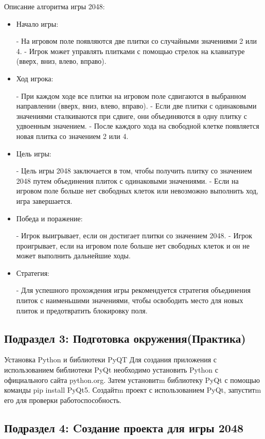 Описание алгоритма игры 2048:
\begin{itemize}
\item Начало игры:

   - На игровом поле появляются две плитки со случайными значениями 2 или 4.
   - Игрок может управлять плитками с помощью стрелок на клавиатуре (вверх, вниз, влево, вправо).
\item Ход игрока:

   - При каждом ходе все плитки на игровом поле сдвигаются в выбранном направлении (вверх, вниз, влево, вправо).
   - Если две плитки с одинаковыми значениями сталкиваются при сдвиге, они объединяются в одну плитку с удвоенным значением.
   - После каждого хода на свободной клетке появляется новая плитка со значением 2 или 4.
\item  Цель игры:

   - Цель игры 2048 заключается в том, чтобы получить плитку со значением 2048 путем объединения плиток с одинаковыми значениями.
   - Если на игровом поле больше нет свободных клеток или невозможно выполнить ход, игра завершается.
\item Победа и поражение:

   - Игрок выигрывает, если он достигает плитки со значением 2048.
   - Игрок проигрывает, если на игровом поле больше нет свободных клеток и он не может выполнить дальнейшие ходы.
\item Стратегия:

   - Для успешного прохождения игры рекомендуется стратегия объединения плиток с наименьшими значениями, чтобы освободить место для новых плиток и предотвратить блокировку поля.
\end{itemize}
\subsection{\label{subsec:ch01/sec01/sub02}Подраздел 3: Подготовка окружения(Практика)}
Установка Python и библиотеки PyQT
Для создания приложения с использованием библиотеки PyQt  необходимо установить Python с официального сайта python.org. Затем установитm библиотеку PyQt с помощью команды pip install PyQt5. Создайтm проект с использованием PyQt, запуститm его для проверки работоспособность.
\subsection{\label{subsec:ch01/sec01/sub02}Подраздел 4: Cоздание проекта для игры 2048}

